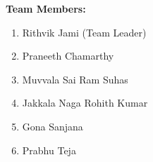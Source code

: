 \begin{titlepage}
    {\noindent \Large \textbf{Team Members:} 
    \begin{enumerate}
        \item \fontsize{14}{19}\selectfont Rithvik Jami (Team Leader) 
        \item \fontsize{14}{19}\selectfont Praneeth Chamarthy 
        \item \fontsize{14}{19}\selectfont Muvvala Sai Ram Suhas 
        \item \fontsize{14}{19}\selectfont Jakkala Naga Rohith Kumar 
        \item \fontsize{14}{19}\selectfont Gona Sanjana 
        \item \fontsize{14}{19}\selectfont Prabhu Teja 
    \end{enumerate}
    }
    

    \vspace{20pt}
 
	\vfill

    {
    \Large

    {\noindent\GetCourse}
    
	{\noindent\GetDepartment}

	{\noindent\GetInstitution}    

    \vspace{35pt}

	{\noindent\GetDate}
    }

    \vspace{28pt}
\end{titlepage}
\restoregeometry
